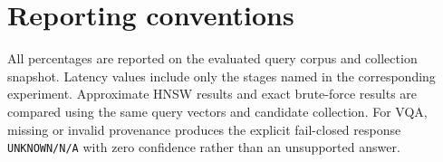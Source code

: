 \documentclass[a4paper,10pt]{article}
\begin{document}
\section*{Reporting conventions}
All percentages are reported on the evaluated query corpus and collection snapshot. Latency values include only the stages named in the corresponding experiment. Approximate HNSW results and exact brute-force results are compared using the same query vectors and candidate collection. For VQA, missing or invalid provenance produces the explicit fail-closed response \texttt{UNKNOWN/N/A} with zero confidence rather than an unsupported answer.
\end{document}
